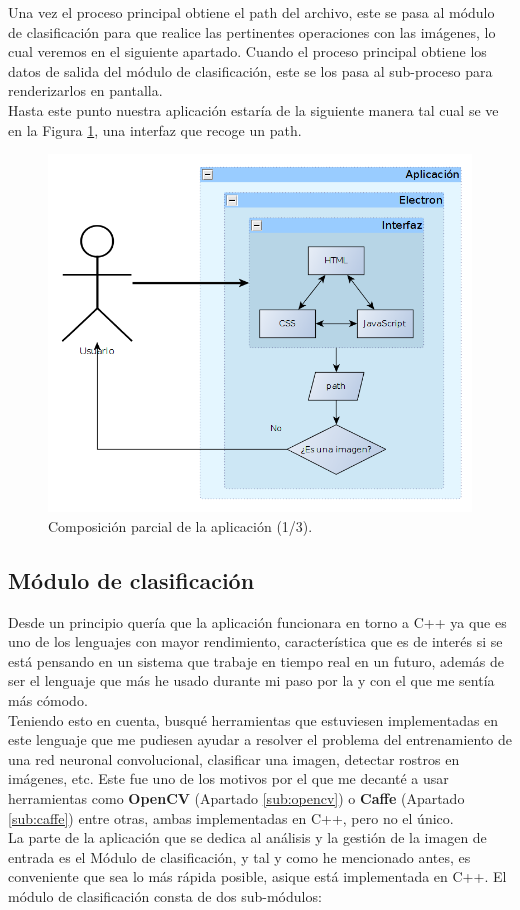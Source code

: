 \documentclass[a4paper,11pt]{book}
\newcommand{\myUni}{\protect{Universidad de Granada}\xspace}
\begin{document}
Una vez el proceso principal obtiene el path del archivo, este se pasa al módulo de clasificación para que realice las pertinentes operaciones con las imágenes, lo cual veremos en el siguiente apartado. Cuando el proceso principal obtiene los datos de salida del módulo de clasificación, este se los pasa al sub-proceso para renderizarlos en pantalla.\\
Hasta este punto nuestra aplicación estaría de la siguiente manera tal cual se ve en la Figura \ref{fig:interfaz}, una interfaz que recoge un path.
\begin{figure}[h]
\centering
\includegraphics[width=0.9\linewidth]{imagenes/interfaz}
\caption[Interfaz]{Composición parcial de la aplicación (1/3).}
\label{fig:interfaz}
\end{figure}


\subsection{Módulo de clasificación}\label{sub:moduloClasificacion}
Desde un principio quería que la aplicación funcionara en torno a C++ ya que es uno de los lenguajes con mayor rendimiento, característica que es de interés si se está pensando en un sistema que trabaje en tiempo real en un futuro, además de ser el lenguaje que más he usado durante mi paso por la \myUni y con el que me sentía más cómodo.\\
Teniendo esto en cuenta, busqué herramientas que estuviesen implementadas en este lenguaje que me pudiesen ayudar a resolver el problema del entrenamiento de una red neuronal convolucional, clasificar una imagen, detectar rostros en imágenes, etc. Este fue uno de los motivos por el que me decanté a usar herramientas como \textbf{OpenCV} (Apartado \ref{sub:opencv}) o \textbf{Caffe} (Apartado \ref{sub:caffe}) entre otras, ambas implementadas en C++, pero no el único.\\
La parte de la aplicación que se dedica al análisis y la gestión de la imagen de entrada es el Módulo de clasificación, y tal y como he mencionado antes, es conveniente que sea lo más rápida posible, asique está implementada en C++. El módulo de clasificación consta de dos sub-módulos:
\end{document}
